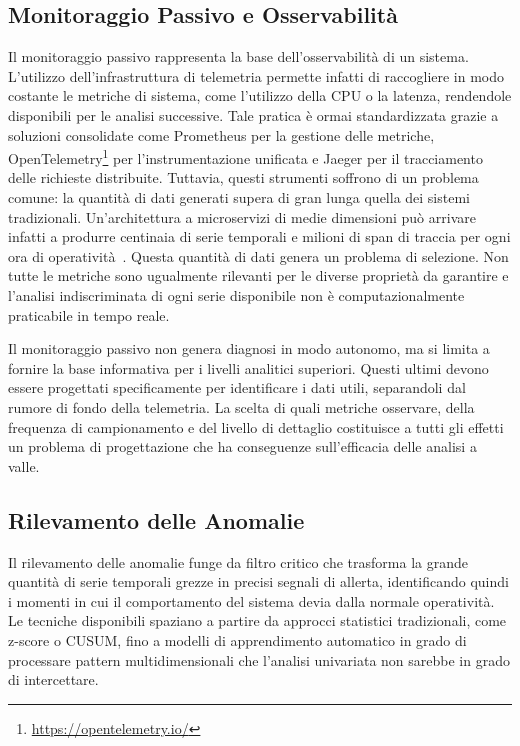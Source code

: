 \subsection{Monitoraggio Passivo e Osservabilità}
\label{subsec:monitoring}

Il monitoraggio passivo rappresenta la base dell'osservabilità di un sistema. 
L'utilizzo dell'infrastruttura di telemetria permette infatti di raccogliere in modo costante 
le metriche di sistema, come l'utilizzo della \gls{CPU} o la latenza, rendendole disponibili per le analisi successive. 
Tale pratica è ormai standardizzata grazie a soluzioni consolidate come Prometheus per la gestione delle metriche, 
OpenTelemetry\footnote{\url{https://opentelemetry.io/}} per l'instrumentazione unificata e Jaeger per il tracciamento delle richieste distribuite. 
Tuttavia, questi strumenti soffrono di un problema comune: la quantità di dati generati supera 
di gran lunga quella dei sistemi tradizionali. Un'architettura a microservizi di medie dimensioni 
può arrivare infatti a produrre centinaia di serie temporali e milioni di span di traccia 
per ogni ora di operatività~\cite{gan2019deathstar}. Questa quantità di dati genera un problema di selezione. 
Non tutte le metriche sono ugualmente rilevanti per le diverse proprietà da garantire e 
l'analisi indiscriminata di ogni serie disponibile non è computazionalmente praticabile in tempo reale.

Il monitoraggio passivo non genera diagnosi in modo autonomo, ma si limita a fornire la base
informativa per i livelli analitici superiori. Questi ultimi devono essere progettati
specificamente per identificare i dati utili, separandoli dal rumore di fondo della telemetria.
La scelta di quali metriche osservare, della frequenza di campionamento e del livello di
dettaglio costituisce a tutti gli effetti un problema di progettazione che ha conseguenze
sull'efficacia delle analisi a valle.

\subsection{Rilevamento delle Anomalie}
\label{subsec:anomaly_detection}

Il rilevamento delle anomalie funge da filtro critico che trasforma la grande quantità di 
serie temporali grezze in precisi segnali di allerta, identificando quindi i momenti in cui 
il comportamento del sistema devia dalla normale operatività. Le tecniche disponibili spaziano 
a partire da approcci statistici tradizionali, come z-score o CUSUM, fino a modelli di apprendimento 
automatico in grado di processare pattern multidimensionali che 
l'analisi univariata non sarebbe in grado di intercettare.


